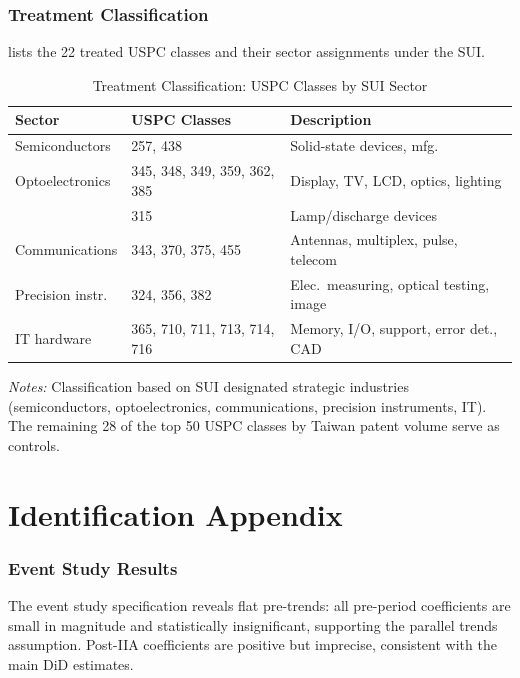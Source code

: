 \documentclass[12pt]{article}
\begin{document}
\subsubsection*{Treatment Classification}  lists the 22 treated USPC classes and their sector assignments under the SUI.

\begin{table}[htbp]
\centering
\caption{Treatment Classification: USPC Classes by SUI Sector}
\label{tab:mapping}
\begin{tabular}{lll}
\toprule
Sector & USPC Classes & Description \\
\midrule
Semiconductors & 257, 438 & Solid-state devices, mfg. \\
Optoelectronics & 345, 348, 349, 359, 362, 385 & Display, TV, LCD, optics, lighting \\
 & 315 & Lamp/discharge devices \\
Communications & 343, 370, 375, 455 & Antennas, multiplex, pulse, telecom \\
Precision instr. & 324, 356, 382 & Elec.\ measuring, optical testing, image \\
IT hardware & 365, 710, 711, 713, 714, 716 & Memory, I/O, support, error det., CAD \\
\bottomrule
\end{tabular}
\begin{tablenotes}
\small
\item \textit{Notes:} Classification based on SUI designated strategic industries (semiconductors, optoelectronics, communications, precision instruments, IT). The remaining 28 of the top 50 USPC classes by Taiwan patent volume serve as controls.
\end{tablenotes}
\end{table}

\section{Identification Appendix}

\subsubsection*{Event Study Results} The event study specification reveals flat pre-trends: all pre-period coefficients are small in magnitude and statistically insignificant, supporting the parallel trends assumption. Post-IIA coefficients are positive but imprecise, consistent with the main DiD estimates.
\end{document}
